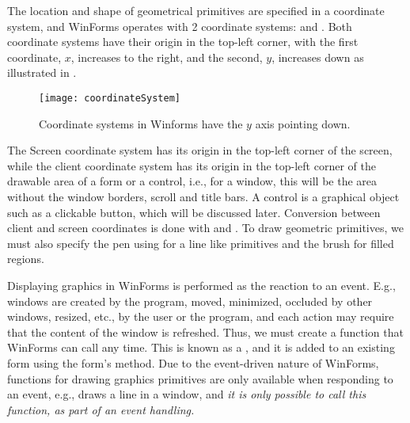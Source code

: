 The location and shape of geometrical primitives are specified in a coordinate system, and WinForms operates with 2 coordinate systems:  and . Both coordinate systems have their origin in the top-left corner, with the first coordinate, $x$, increases to the right, and the second, $y$, increases down as illustrated in .
%
\begin{figure}
  \centering
  \texttt{[image: coordinateSystem]}
  \caption{Coordinate systems in Winforms have the $y$ axis pointing down.}
  \label{fig:coordinateSystem}
\end{figure}
%
The Screen coordinate system has its origin in the top-left corner of the screen, while the client coordinate system has its origin in the top-left corner of the drawable area of a form or a control, i.e., for a window, this will be the area without the window borders, scroll and title bars. A control is a graphical object such as a clickable button, which will be discussed later. Conversion between client and screen coordinates is done with  and . To draw geometric primitives, we must also specify the pen using for a line like primitives and the brush for filled regions.

Displaying graphics in WinForms is performed as the reaction to an event. E.g., windows are created by the program, moved, minimized, occluded by other windows, resized, etc., by the user or the program, and each action may require that the content of the window is refreshed. Thus, we must create a function that WinForms can call any time. This is known as a , and it is added to an existing form using the form's  method. Due to the event-driven nature of WinForms, functions for drawing graphics primitives are only available when responding to an event, e.g.,  draws a line in a window, and \emph{it is only possible to call this function, as part of an event handling.}


